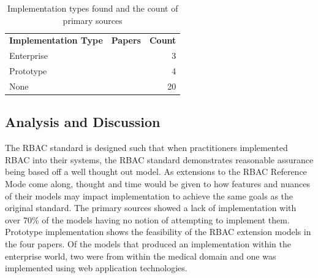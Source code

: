 \begin{table}
\centering
\caption{Implementation types found and the count of primary sources}
\vspace{0.1 in}
\begin{tabular*}{.9\linewidth}{| l | p{.5\linewidth} | r | }
\cline{1-3}

\textbf{Implementation Type} & \textbf{Papers} & \textbf{Count} \\ \cline{1-3}
Enterprise
&
\cite{motta03:contextual}
\cite{aich09:role}
\cite{yao2008task}
&
3 \\ \cline{1-3}
Prototype
& 
\cite{cholewka00:acontext-sensitive}
\cite{huang06:pervasive}
\cite{bao08:role}
\cite{zhou2007team}
&
4 \\ \cline{1-3}
None
&
\cite{ni2010privacy}
\cite{jian2008extended}
\cite{alam06:constraint}
\cite{tzelepi01:flexible}
\cite{yamazaki04:designing}
\cite{thein2011leveraging}
\cite{zou2009crbac}
\cite{haibo05:context}
\cite{zhang06:collaborative}
\cite{masoumzadeh2008purbac}
\cite{damiani2007geo}
\cite{ray2006lrbac}
\cite{hansen2003spatial}
\cite{aich07:STARBAC}
\cite{chen08:spatio-temporal}
\cite{samuel07:spatio-temporal}
\cite{chandran05:llt}
\cite{ray07:spatio}
\cite{oh2003task}
\cite{joshi05:generalized}
&
20 \\

\cline{1-3}
\end{tabular*}
\label{tab:implementations}
\end{table}

\subsection{Analysis and Discussion}

The RBAC standard is designed such that when practitioners implemented RBAC into their systems, the RBAC standard demonstrates reasonable assurance being based off a well thought out model.
As extensions to the RBAC Reference Mode come along, thought and time would be given to how features and nuances of their models may impact implementation to achieve the same goals as the original standard. 
The primary sources showed a lack of implementation
with over 70\% of the models having no notion of attempting to implement them. Prototype implementation shows the feasibility of the RBAC extension models in the four papers. Of the models that produced an implementation within the enterprise world, two were from within the medical domain and one was implemented using web application technologies.  


